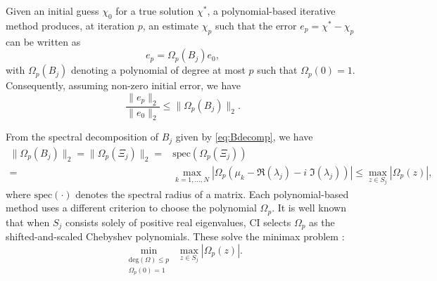 \documentclass{article}
\newcommand{\sizeA}{N}
\theoremstyle{definition}
\newcommand{\poly}{\Omega}
\begin{document}
{		Given an initial guess $\chi_0$ for a true solution $\chi^{\ast}$, a polynomial-based iterative method produces, at iteration $p$, an estimate $\chi_p$ such that the error $e_p = \chi^{\ast} - \chi_p$ can be written as 
		\begin{equation*}
			{e}_p = \poly_p(B_j) {e}_0,
		\end{equation*}
		with $\poly_p(B_j)$ denoting a polynomial of degree at most $p$ such that $\poly_p(0) = 1$.  
		Consequently, assuming non-zero initial error, we have
		\begin{equation}\label{ep_error}
			\frac{\| {e}_p \|_2}{\| {e}_0 \|_2} \le \|  \poly_p(B_j) \|_2.
		\end{equation}
		
		
		From the spectral decomposition of $B_j$ given by \eqref{eq:Bdecomp}, we have
		\begin{align}
			\nonumber
			\|  \poly_p(B_j) \|_2 = \|  \poly_p(\Xi_j) \|_2 ={}& \text{spec} ( \poly_p(\Xi_j) ) \\
			\label{eq:norm_bound} ={}& \max_{k = 1, \ldots, \sizeA} |  \poly_p(\mu_k - \Re(\lambda_j) - i\; \Im(\lambda_j))  | \le \max_{{z} \in S_j} |  \poly_p( {z})|,
		\end{align}
		where $\text{spec}(\cdot)$ denotes the spectral radius of a matrix. 
		Each polynomial-based method uses a different criterion to choose the polynomial $\poly_p$.  It is well known \cite[Sec 5.3 and Appendix B]{axelsson1996iterative} that when $S_j$ consists solely of positive real eigenvalues, CI selects $\poly_p$ as the shifted-and-scaled Chebyshev polynomials. These solve the minimax problem \cite[Appendix A3]{weaver_correlation_2016}:
		\begin{equation}
			\label{Prob_minmax}
			\min_{\substack{ \text{deg}(\poly) \le p \\ \poly_p(0)  = 1} }  \; \max_{z \in S_j} |  \poly_p( z)  |.
		\end{equation}
		
}
\end{document}
